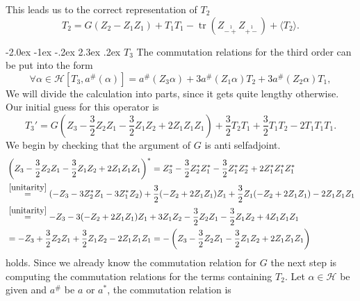 \documentclass[oneside,reqno,12pt]{amsart}
\makeatletter
\DeclareMathOperator{\tr}{tr}
\renewcommand\section{\@startsection {section}{1}{\z@}%
                                   {-2.0ex \@plus -1ex \@minus -.2ex}%
                                   {2.3ex \@plus.2ex}%
                                   {\normalfont\Large\bfseries}}
\makeatother
\begin{document}
This leads us to the correct representation of \(T_2\)
\begin{equation}
T_2=G(Z_2-Z_1Z_1)+T_1T_1 -\tr \left(Z_{\stackrel{1}{-+}}Z_{\stackrel{1}{+-}}\right) + \langle T_2\rangle.
\end{equation}

\section{\(T_3\)}
The commutation relations for the third order can be put into the form 
\begin{equation}\label{T3 commutation}
\forall \alpha \in \mathcal{H} \left[ T_3, a^{\#}(\alpha)\right]= a^{\#}\left( Z_3 \alpha \right) + 3 a^{\#} \left( Z_1 \alpha \right) T_2+3 a^{\#} \left( Z_2 \alpha \right) T_1,
\end{equation}
We will divide the calculation into parts, since it gets quite lengthy otherwise. Our initial guess for this operator is 
\begin{equation}
T_3'=G\left( Z_3 - \frac{3}{2}Z_2Z_1 - \frac{3}{2}Z_1Z_2 + 2 Z_1Z_1Z_1\right)+ \frac{3}{2}T_2T_1 + \frac{3}{2} T_1T_2 - 2 T_1T_1T_1 
.\end{equation}
We begin by checking that the argument of \(G\) is anti selfadjoint. 
\begin{align*}
&\left( Z_3 - \frac{3}{2}Z_2Z_1 - \frac{3}{2}Z_1Z_2 + 2 Z_1Z_1Z_1\right)^*
=Z_3^*-  \frac{3}{2}Z^*_2 Z^*_1 - \frac{3}{2}Z^*_1 Z^*_2 + 2 Z^*_1 Z^*_1 Z^*_1\\
&\stackrel{\eqref{unitarity}}{=}
(-Z_3 -3Z_2^*Z_1 - 3 Z_1^* Z_2 )+ \frac{3}{2}(-Z_2 + 2Z_1Z_1)Z_1 + \frac{3}{2}Z_1(-Z_2+2Z_1Z_1) - 2 Z_1Z_1Z_1\\
&\stackrel{\eqref{unitarity}}{=}
-Z_3 -3(-Z_2+2Z_1Z_1)Z_1 + 3 Z_1 Z_2 - \frac{3}{2}Z_2 Z_1 - \frac{3}{2}Z_1Z_2 + 4 Z_1Z_1Z_1\\
&=-Z_3  + \frac{3}{2}Z_2 Z_1 +\frac{3}{2}Z_1Z_2 -2 Z_1Z_1Z_1
=-\left( Z_3 - \frac{3}{2}Z_2Z_1 - \frac{3}{2}Z_1Z_2 + 2 Z_1Z_1Z_1\right)
\end{align*}
holds. Since we already know the commutation relation for \(G\) the next step is computing the commutation relations for the terms containing \(T_2\). Let \(\alpha\in\mathcal{H}\) be given and \(a^{\#}\) be \(a\) or \(a^*\), the commutation relation is
\end{document}
